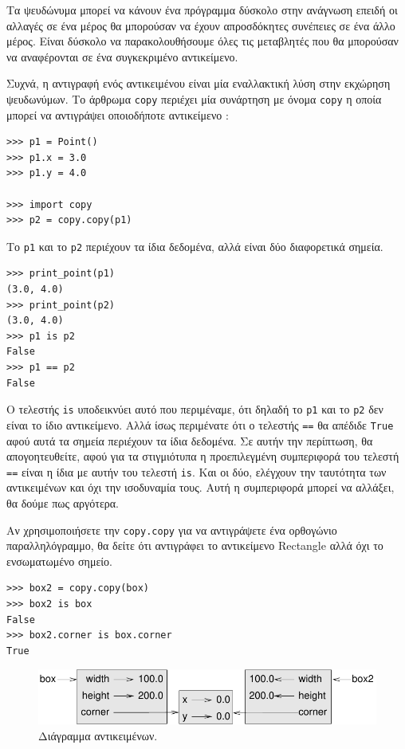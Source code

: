 \documentclass[10pt]{book}
\begin{document}
Τα ψευδώνυμα μπορεί να κάνουν ένα πρόγραμμα δύσκολο στην ανάγνωση επειδή οι αλλαγές σε ένα μέρος θα μπορούσαν να έχουν απροσδόκητες συνέπειες σε ένα άλλο μέρος.  Είναι δύσκολο να παρακολουθήσουμε όλες τις μεταβλητές που θα μπορούσαν να αναφέρονται σε ένα συγκεκριμένο αντικείμενο.

Συχνά, η αντιγραφή ενός αντικειμένου είναι μία εναλλακτική λύση στην εκχώρηση ψευδωνύμων. Το άρθρωμα  {\tt copy}  περιέχει μία συνάρτηση με όνομα  {\tt copy}  η οποία μπορεί να αντιγράψει οποιοδήποτε αντικείμενο :

\begin{verbatim}
>>> p1 = Point()
>>> p1.x = 3.0
>>> p1.y = 4.0

>>> import copy
>>> p2 = copy.copy(p1)
\end{verbatim}
%
 Το  {\tt p1}  και το  {\tt p2}  περιέχουν τα ίδια δεδομένα, αλλά είναι δύο διαφορετικά σημεία.  

\begin{verbatim}
>>> print_point(p1)
(3.0, 4.0)
>>> print_point(p2)
(3.0, 4.0)
>>> p1 is p2
False
>>> p1 == p2
False
\end{verbatim}
%
 Ο τελεστής  {\tt is}  υποδεικνύει αυτό που περιμέναμε, ότι δηλαδή το  {\tt p1}  και το  {\tt p2}   δεν είναι το ίδιο αντικείμενο. Αλλά ίσως περιμένατε ότι ο τελεστής  {\tt ==}  θα απέδιδε  {\tt True}  αφού αυτά τα σημεία περιέχουν τα ίδια δεδομένα. Σε αυτήν την περίπτωση, θα απογοητευθείτε, αφού για τα στιγμιότυπα η προεπιλεγμένη συμπεριφορά του τελεστή  {\tt ==}  είναι η ίδια με αυτήν του τελεστή  {\tt is}.  
Και οι δύο, ελέγχουν την ταυτότητα των αντικειμένων και όχι την ισοδυναμία τους. Αυτή η συμπεριφορά μπορεί να αλλάξει, θα δούμε πως αργότερα.

Αν χρησιμοποιήσετε την  {\tt copy.copy}  για να αντιγράψετε ένα ορθογώνιο παραλληλόγραμμο, θα δείτε ότι αντιγράφει το αντικείμενο  Rectangle  αλλά όχι το ενσωματωμένο σημείο. 

\begin{verbatim}
>>> box2 = copy.copy(box)
>>> box2 is box
False
>>> box2.corner is box.corner
True
\end{verbatim}

\begin{figure}
\centerline
{\includegraphics[scale=0.8]{figs/rectangle2.pdf}}
 \caption{Διάγραμμα αντικειμένων.} 
\label{fig.rectangle2}
\end{figure}
\end{document}
